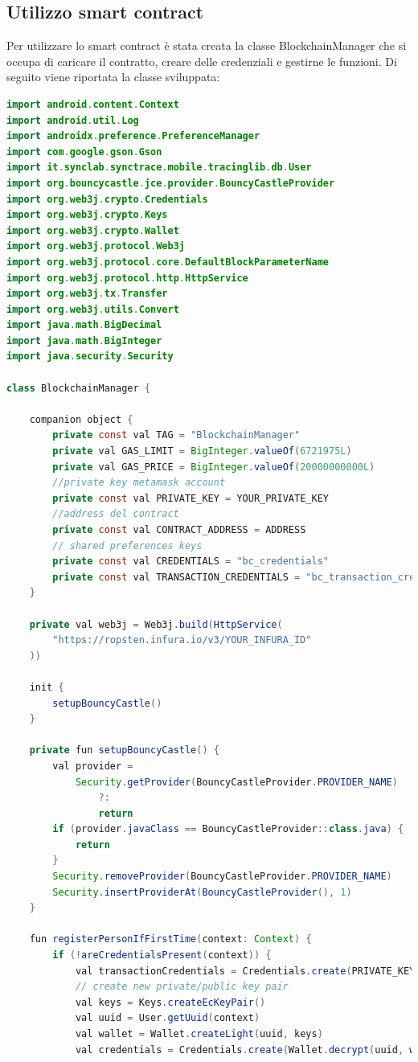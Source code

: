 \subsection{Utilizzo smart contract}
Per utilizzare lo smart contract è stata creata la classe BlockchainManager che si occupa di caricare il contratto, creare delle credenziali e gestirne le funzioni.
Di seguito viene riportata la classe sviluppata:
\begin{lstlisting}[language = Java]
import android.content.Context
import android.util.Log
import androidx.preference.PreferenceManager
import com.google.gson.Gson
import it.synclab.synctrace.mobile.tracinglib.db.User
import org.bouncycastle.jce.provider.BouncyCastleProvider
import org.web3j.crypto.Credentials
import org.web3j.crypto.Keys
import org.web3j.crypto.Wallet
import org.web3j.protocol.Web3j
import org.web3j.protocol.core.DefaultBlockParameterName
import org.web3j.protocol.http.HttpService
import org.web3j.tx.Transfer
import org.web3j.utils.Convert
import java.math.BigDecimal
import java.math.BigInteger
import java.security.Security

class BlockchainManager {

    companion object {
        private const val TAG = "BlockchainManager"
        private val GAS_LIMIT = BigInteger.valueOf(6721975L)
        private val GAS_PRICE = BigInteger.valueOf(20000000000L)
		//private key metamask account
        private const val PRIVATE_KEY = YOUR_PRIVATE_KEY
		//address del contract
        private const val CONTRACT_ADDRESS = ADDRESS
        // shared preferences keys
        private const val CREDENTIALS = "bc_credentials"
        private const val TRANSACTION_CREDENTIALS = "bc_transaction_credentials"
    }

    private val web3j = Web3j.build(HttpService(
        "https://ropsten.infura.io/v3/YOUR_INFURA_ID"
    ))

    init {
        setupBouncyCastle()
    }

    private fun setupBouncyCastle() {
        val provider =
            Security.getProvider(BouncyCastleProvider.PROVIDER_NAME)
                ?: 
                return
        if (provider.javaClass == BouncyCastleProvider::class.java) {
            return
        }
        Security.removeProvider(BouncyCastleProvider.PROVIDER_NAME)
        Security.insertProviderAt(BouncyCastleProvider(), 1)
    }

    fun registerPersonIfFirstTime(context: Context) {
        if (!areCredentialsPresent(context)) {
            val transactionCredentials = Credentials.create(PRIVATE_KEY)
            // create new private/public key pair
            val keys = Keys.createEcKeyPair()
            val uuid = User.getUuid(context)
            val wallet = Wallet.createLight(uuid, keys)
            val credentials = Credentials.create(Wallet.decrypt(uuid, wallet))


\end{lstlisting}
